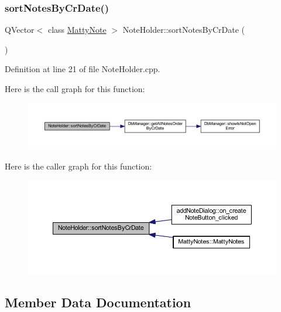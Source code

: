 \subsubsection{\texorpdfstring{sort\+Notes\+By\+Cr\+Date()}{sortNotesByCrDate()}}
{\footnotesize\ttfamily Q\+Vector$<$ class \hyperlink{classMattyNote}{Matty\+Note} $>$ Note\+Holder\+::sort\+Notes\+By\+Cr\+Date (\begin{DoxyParamCaption}{ }\end{DoxyParamCaption})\hspace{0.3cm}{\ttfamily [static]}}



Definition at line 21 of file Note\+Holder.\+cpp.

Here is the call graph for this function\+:
\nopagebreak
\begin{figure}[H]
\begin{center}
\leavevmode
\includegraphics[width=350pt]{classNoteHolder_ab52d375cf5ab24f0512fab6308ec8b25_cgraph}
\end{center}
\end{figure}
Here is the caller graph for this function\+:
\nopagebreak
\begin{figure}[H]
\begin{center}
\leavevmode
\includegraphics[width=350pt]{classNoteHolder_ab52d375cf5ab24f0512fab6308ec8b25_icgraph}
\end{center}
\end{figure}


\subsection{Member Data Documentation}
\hypertarget{classNoteHolder_a9106819d414e3e131560ef3fcbea4d18}{}\label{classNoteHolder_a9106819d414e3e131560ef3fcbea4d18} 
